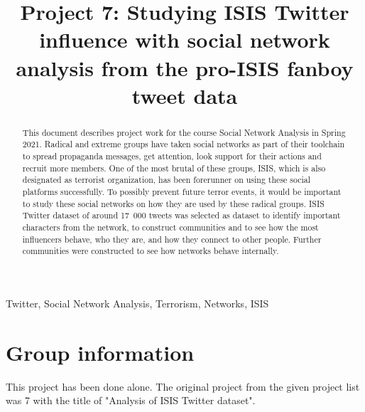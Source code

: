 \documentclass[conference]{IEEEtran}
\begin{document}
\title{Project 7: Studying  ISIS Twitter influence with social network analysis from the pro-ISIS fanboy tweet data}




\author{
}

\maketitle

\begin{abstract}
    This document describes project work for the course Social Network Analysis in Spring 2021.
    Radical and extreme groups have taken social networks as part of their toolchain to spread propaganda messages,
    get attention, look support for their actions and recruit more members.
    One of the most brutal of these groups, ISIS, which is also designated as terrorist organization, has been forerunner on using these social platforms successfully.
    To possibly prevent future terror events, it would be important to study these social networks on how they are used by these radical groups.
    ISIS Twitter dataset of around 17~000 tweets was selected as dataset to identify important characters from the network, to construct communities and to see how the most influencers behave, who they are, and how they connect to other people.
    Further communities were constructed to see how networks behave internally.

\end{abstract}

\begin{IEEEkeywords}
    Twitter, Social Network Analysis, Terrorism, Networks, ISIS
\end{IEEEkeywords}

\section{Group information}\label{sec:group-description}

This project has been done alone.
The original project from the given project list was 7 with the title of "Analysis of ISIS Twitter dataset".
\end{document}
